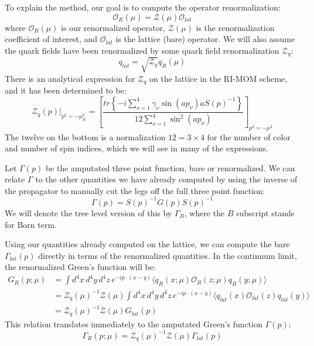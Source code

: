 \documentclass[11pt, oneside]{article}   	%
\theoremstyle{definition}
\begin{document}
To explain the method, our goal is to compute the operator renormalization:
\begin{equation}
	\mathcal O_R(\mu) = \mathcal Z(\mu)\mathcal O_{lat}
\end{equation}
where $\mathcal O_R(\mu)$ is our renormalized operator, $\mathcal Z(\mu)$ is the renormalization coefficient of 
interest, and $\mathcal O_{lat}$ is the lattice (bare) operator. We will also assume the quark fields have been 
renormalized by some quark field renormalization $\mathcal Z_q$:
\begin{equation}
	q_{lat} = \sqrt{\mathcal Z_q} q_R(\mu)
\end{equation}
There is an analytical expression for $\mathcal{Z}_q$ on the lattice in the RI-MOM scheme, and it has been determined 
to be:
\begin{equation}
	\mathcal Z_q(p)|_{p^2 = -\mu_R^2} = \left[\frac{tr\left\{-i\sum_{\nu = 1}^4 \gamma_\nu \sin(ap_\nu) a S(p)^{-1}\right\}}{12\sum_{\nu = 1}^4 \sin^2(ap_\nu)}\right]_{p^2 = -\mu^2}
\end{equation}
The twelve on the bottom is a normalization $12 = 3\times 4$ for the number of color and number of spin indices, which we will 
see in many of the expressions. 

Let $\Gamma(p)$ be the amputated three point function, bare or renormalized. We can relate $\Gamma$ to the other 
quantities we have already computed by using the inverse of the propagator to manually cut the legs off the full three 
point function:
\begin{equation}
	\Gamma(p) = S(p)^{-1} G(p) S(p)^{-1}
\end{equation}
We will denote the tree level version of this by $\Gamma_B$, where the $B$ subscript stands for Born term. 

Using our quantities already computed on the lattice, we can compute the bare $\Gamma_{lat}(p)$ directly in terms 
of the renormalized quantities. In the continuum limit, the renormalized Green's function will be:
\begin{align}
	G_R(p; \mu) &= \int d^4x \, d^4 y\, d^4 z\, e^{-ip\cdot (x - y)} \langle q_R(x; \mu) \mathcal O_R(z; \mu) q_R(y; \mu) \rangle \\
	&= \mathcal Z_q(\mu)^{-1} \mathcal Z(\mu) \int d^4x \, d^4 y\, d^4 z\, e^{-ip\cdot (x - y)} \langle q_{lat}(x) \mathcal O_{lat}(z) q_{lat}(y) \rangle \\
	&= \mathcal Z_q(\mu)^{-1} \mathcal Z(\mu) G_{lat}(p)
\end{align}
This relation translates immediately to the amputated Green's function $\Gamma(p)$:
\begin{equation}
	\Gamma_R(p; \mu) = \mathcal Z_q(\mu)^{-1}\mathcal Z(\mu) \Gamma_{lat}(p)
\end{equation}
\end{document}
